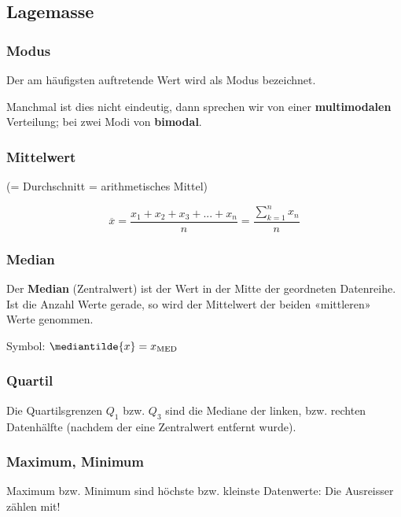 \begin{multicols}{2}

\subsection*{Lagemasse}


\subsubsection*{Modus}
Der am häufigsten auftretende Wert wird als Modus bezeichnet.

Manchmal ist dies nicht eindeutig, dann sprechen wir von einer
\textbf{multimodalen} Verteilung; bei zwei Modi von \textbf{bimodal}.


\subsubsection*{Mittelwert}
(= Durchschnitt = arithmetisches Mittel)

$$\overline{x} = \frac{x_1 + x_2 + x_3 + ... +
x_n}{n}=  \frac{\sum\limits_{k=1}^nx_n}n$$

\subsubsection*{Median}


Der \textbf{Median} (Zentralwert) ist der Wert in der Mitte der geordneten Datenreihe. Ist
die Anzahl Werte gerade, so wird der Mittelwert der beiden
«mittleren» Werte genommen.

Symbol: $\mediantilde{x} = x_{\textrm{MED}}$


\subsubsection*{Quartil}

Die Quartilsgrenzen $Q_1$ bzw. $Q_3$ sind die Mediane der linken,
bzw. rechten Datenhälfte (nachdem der eine Zentralwert entfernt
wurde).

\subsubsection*{Maximum, Minimum}

Maximum bzw. Minimum sind höchste bzw. kleinste Datenwerte: Die Ausreisser
zählen mit!

\RLP{\forceCB}%
\headerUndFooterDieseSeite{}



\end{multicols}
